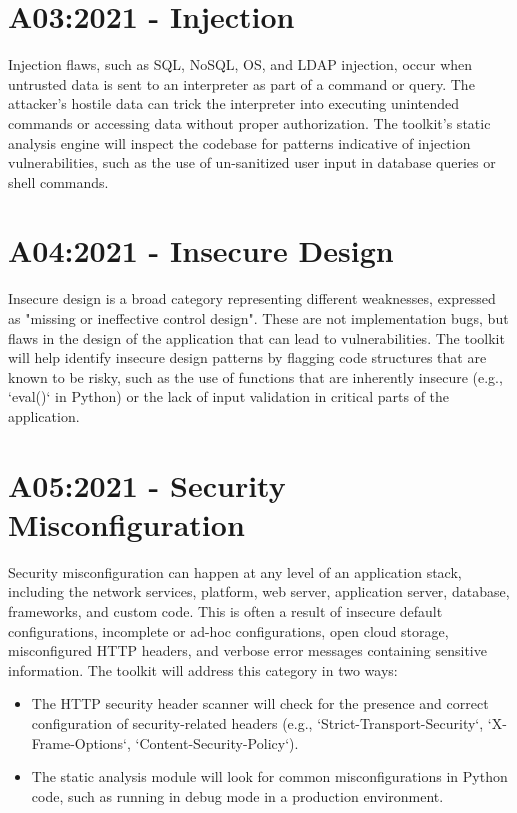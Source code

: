 \section{A03:2021 - Injection}
Injection flaws, such as SQL, NoSQL, OS, and LDAP injection, occur when untrusted data is sent to an interpreter as part of a command or query. The attacker's hostile data can trick the interpreter into executing unintended commands or accessing data without proper authorization.
The toolkit's static analysis engine will inspect the codebase for patterns indicative of injection vulnerabilities, such as the use of un-sanitized user input in database queries or shell commands.

\section{A04:2021 - Insecure Design}
Insecure design is a broad category representing different weaknesses, expressed as "missing or ineffective control design". These are not implementation bugs, but flaws in the design of the application that can lead to vulnerabilities.
The toolkit will help identify insecure design patterns by flagging code structures that are known to be risky, such as the use of functions that are inherently insecure (e.g., `eval()` in Python) or the lack of input validation in critical parts of the application.

\section{A05:2021 - Security Misconfiguration}
Security misconfiguration can happen at any level of an application stack, including the network services, platform, web server, application server, database, frameworks, and custom code. This is often a result of insecure default configurations, incomplete or ad-hoc configurations, open cloud storage, misconfigured HTTP headers, and verbose error messages containing sensitive information.
The toolkit will address this category in two ways:
\begin{itemize}
    \item The HTTP security header scanner will check for the presence and correct configuration of security-related headers (e.g., `Strict-Transport-Security`, `X-Frame-Options`, `Content-Security-Policy`).
    \item The static analysis module will look for common misconfigurations in Python code, such as running in debug mode in a production environment.
\end{itemize}

